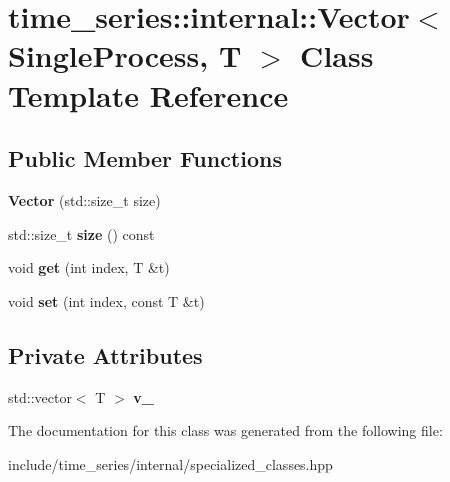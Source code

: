 \hypertarget{classtime__series_1_1internal_1_1Vector_3_01SingleProcess_00_01T_01_4}{}\section{time\+\_\+series\+:\+:internal\+:\+:Vector$<$ Single\+Process, T $>$ Class Template Reference}
\label{classtime__series_1_1internal_1_1Vector_3_01SingleProcess_00_01T_01_4}
\subsection*{Public Member Functions}
\begin{DoxyCompactItemize}
\item 
\mbox{\label{classtime__series_1_1internal_1_1Vector_3_01SingleProcess_00_01T_01_4_aa098f4f87f80ef5238777a1b2f1ed761}} 
{\bfseries Vector} (std\+::size\+\_\+t size)
\item 
\mbox{\label{classtime__series_1_1internal_1_1Vector_3_01SingleProcess_00_01T_01_4_a2efbb5925dc058a8e7251617aa1e7af4}} 
std\+::size\+\_\+t {\bfseries size} () const
\item 
\mbox{\label{classtime__series_1_1internal_1_1Vector_3_01SingleProcess_00_01T_01_4_a62c2a28b1f3a2a1807526741a6d446fa}} 
void {\bfseries get} (int index, T \&t)
\item 
\mbox{\label{classtime__series_1_1internal_1_1Vector_3_01SingleProcess_00_01T_01_4_a42eba57809b83e3d38f1afa5e0ca2025}} 
void {\bfseries set} (int index, const T \&t)
\end{DoxyCompactItemize}
\subsection*{Private Attributes}
\begin{DoxyCompactItemize}
\item 
\mbox{\label{classtime__series_1_1internal_1_1Vector_3_01SingleProcess_00_01T_01_4_aae291cb7013fed36911dafaabb09978b}} 
std\+::vector$<$ T $>$ {\bfseries v\+\_\+}
\end{DoxyCompactItemize}


The documentation for this class was generated from the following file\+:\begin{DoxyCompactItemize}
\item 
include/time\+\_\+series/internal/specialized\+\_\+classes.\+hpp\end{DoxyCompactItemize}

